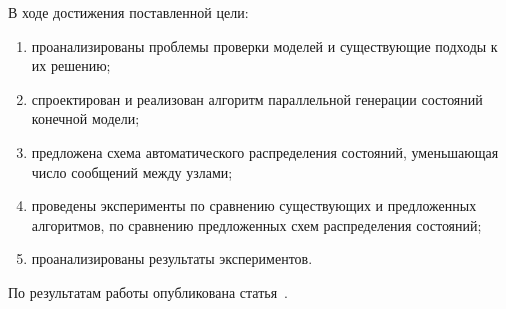 \Conclusion

В ходе достижения поставленной цели:
\begin{enumerate}
\item проанализированы проблемы проверки моделей и существующие подходы к их решению;
\item спроектирован и реализован алгоритм параллельной генерации состояний конечной
  модели;
\item предложена схема автоматического распределения состояний, уменьшающая число
  сообщений между узлами;
\item проведены эксперименты по сравнению существующих и предложенных алгоритмов, по
  сравнению предложенных схем распределения состояний;
\item проанализированы результаты экспериментов.
\end{enumerate}

По результатам работы опубликована статья~\cite{BelovedMe}.

